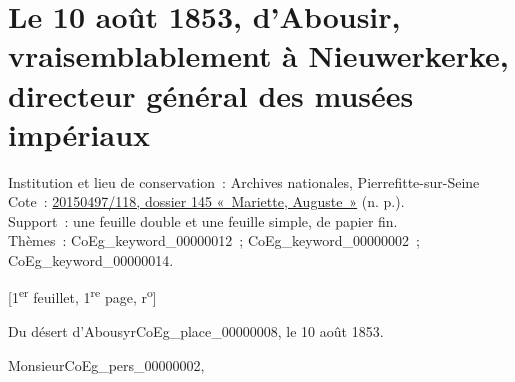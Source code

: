 \documentclass{book}
\begin{document}
\hypertarget{CoEg_Mariette_1853-08-10}{}
\section*{Le 10 août 1853, d’Abousir, vraisemblablement à Nieuwerkerke, directeur général des musées impériaux}
{\footnotesize \noindent Institution et lieu de conservation~: Archives nationales, Pierrefitte-sur-Seine\\
Cote~: \hyperlink{CoEg_Mariette_ms_001}{20150497/118, dossier 145 «~Mariette, Auguste~»} (n. p.).\\
Support~: une feuille double et une feuille simple, de papier fin.\\
Thèmes~: \gls{CoEg_keyword_00000012}~; \gls{CoEg_keyword_00000002}~; \gls{CoEg_keyword_00000014}.
\begin{center} {[1\textsuperscript{er} feuillet, 1\textsuperscript{re} page, r\textsuperscript{o}]}\end{center}}
\begin{flushright}Du désert d’Abousyr\gls{CoEg_place_00000008}, le 10 août 1853.\end{flushright}

\hspace{1cm} Monsieur\gls{CoEg_pers_00000002},\\
\end{document}
